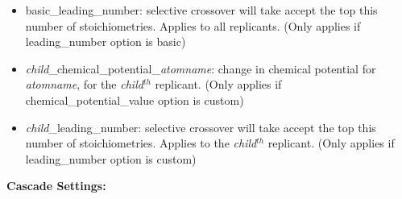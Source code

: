 \begin{itemize}
\item basic\_leading\_number: selective crossover will take accept the top this number of stoichiometries. Applies to all replicants. (Only applies if leading\_number option is basic)

\item {\em child}\_chemical\_potential\_{\em atomname}: change in chemical potential for {\em atomname}, for the {\em child}$^{th}$ replicant.
(Only applies if chemical\_potential\_value option is custom)

\item {\em child}\_leading\_number: selective crossover will take accept the top this number of stoichiometries. Applies to the {\em child}$^{th}$ replicant. (Only applies if leading\_number option is custom)

\end{itemize}

\textbf{Cascade Settings:}

